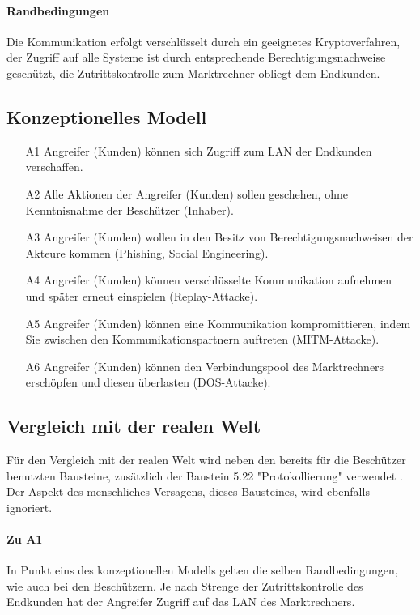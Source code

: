 \documentclass[11pt,a4paper]{report}
\begin{document}
\paragraph{Randbedingungen} Die Kommunikation erfolgt verschlüsselt durch ein geeignetes Kryptoverfahren, der Zugriff auf alle Systeme ist durch entsprechende Berechtigungsnachweise geschützt, die Zutrittskontrolle zum Marktrechner obliegt dem Endkunden.

\subsection{Konzeptionelles Modell}

\begin{enumerate}[leftmargin=*]
\item[A1] Angreifer (Kunden) können sich Zugriff zum LAN der Endkunden verschaffen.
\item[A2] Alle Aktionen der Angreifer (Kunden) sollen geschehen, ohne Kenntnisnahme der Beschützer (Inhaber).
\item[A3] Angreifer (Kunden) wollen in den Besitz von Berechtigungsnachweisen der Akteure kommen (Phishing, Social Engineering).
\item[A4] Angreifer (Kunden) können verschlüsselte Kommunikation aufnehmen und später erneut einspielen (Replay-Attacke).
\item[A5] Angreifer (Kunden) können eine Kommunikation kompromittieren, indem Sie zwischen den Kommunikationspartnern auftreten (MITM-Attacke).
\item[A6] Angreifer (Kunden) können den Verbindungspool des Marktrechners erschöpfen und diesen überlasten (DOS-Attacke).
\end{enumerate}

\subsection{Vergleich mit der realen Welt}

Für den Vergleich mit der realen Welt wird neben den bereits für die Beschützer benutzten Bausteine, zusätzlich der Baustein 5.22 "Protokollierung" verwendet \cite{bsi_b5022}. Der Aspekt des menschliches Versagens, dieses Bausteines, wird ebenfalls ignoriert.

\paragraph{Zu A1} In Punkt eins des konzeptionellen Modells gelten die selben Randbedingungen, wie auch bei den Beschützern. Je nach Strenge der Zutrittskontrolle des Endkunden hat der Angreifer Zugriff auf das LAN des Marktrechners.
\end{document}
